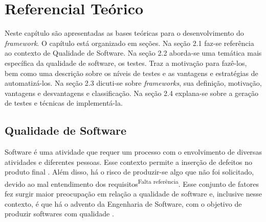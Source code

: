 \chapter[Referencial Teórico]{Referencial Teórico}
Neste capítulo são apresentadas as bases teóricas para o desenvolvimento do \textit{framework}. O capítulo está organizado em seções. Na seção 2.1 faz-se referência ao contexto de Qualidade de Software. Na seção 2.2 aborda-se uma temática mais específica da qualidade de software, os testes. Traz a motivação para fazê-los, bem como uma descrição sobre os níveis de testes e as vantagens e estratégias de automatizá-los. Na seção 2.3 dicuti-se sobre \textit{frameworks}, sua definição, motivação, vantagens e desvantagens e classificação. Na seção 2.4 explana-se sobre a geração de testes e técnicas de implementá-la.

\section{Qualidade de Software}
Software é uma atividade que requer um processo com o envolvimento de diversas atividades e diferentes pessoas. Esse contexto permite a inserção de defeitos no produto final \cite{trodo_2009}. Além disso, há o risco de produzir-se algo que não foi solicitado, devido ao mal entendimento dos requisitos\textsuperscript{Falta referência}. Esse conjunto de fatores fez surgir maior preocupação em relação a qualidade de software e, inclusive nesse contexto, é que há o advento da Engenharia de Software, com o objetivo de produzir softwares com qualidade \cite{bueno_e_campelo_2013}.

